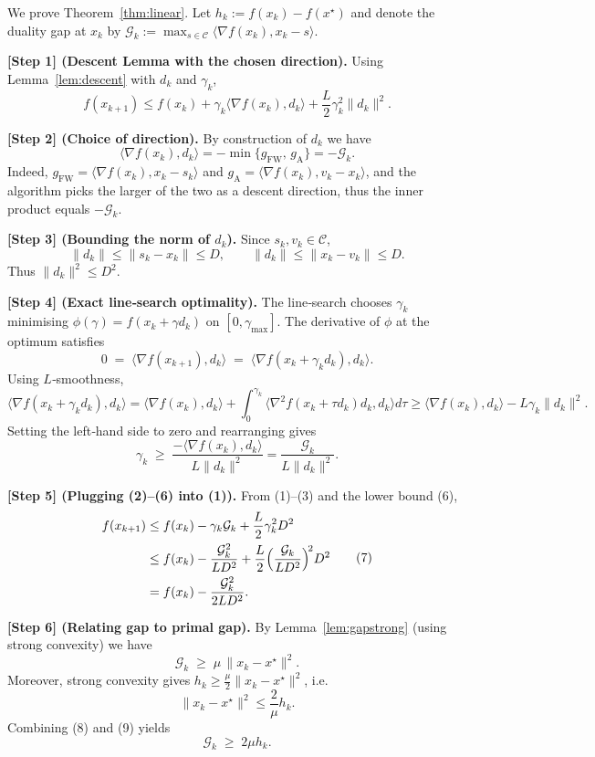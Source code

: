 \documentclass{article}
\newcommand{\gap}{\mathcal{G}}
\begin{document}
We prove Theorem~\ref{thm:linear}. Let $h_k:=f(x_k)-f(x^\star)$ and denote the duality gap at $x_k$ by $\gap_k:=\max_{s\in\mathcal{C}}\langle\nabla f(x_k),x_k-s\rangle$.

\noindent\textbf{[Step 1] (Descent Lemma with the chosen direction).}
Using Lemma~\ref{lem:descent} with $d_k$ and $\gamma_k$,
\[
f(x_{k+1})\le f(x_k)+\gamma_k\langle\nabla f(x_k),d_k\rangle+\frac{L}{2}\gamma_k^2\|d_k\|^2 .
\tag{1}
\]

\noindent\textbf{[Step 2] (Choice of direction).}
By construction of $d_k$ we have
\[
\langle\nabla f(x_k),d_k\rangle = -\min\bigl\{g_{\text{FW}},\,g_{\text{A}}\bigr\}
= -\gap_k .
\tag{2}
\]
Indeed, $g_{\text{FW}}=\langle\nabla f(x_k),x_k-s_k\rangle$ and $g_{\text{A}}=\langle\nabla f(x_k),v_k-x_k\rangle$, and the algorithm picks the larger of the two as a descent direction, thus the inner product equals $-\gap_k$.

\noindent\textbf{[Step 3] (Bounding the norm of $d_k$).}
Since $s_k,v_k\in\mathcal{C}$,
\[
\|d_k\|\le \|s_k-x_k\|\le D,\qquad \|d_k\|\le\|x_k-v_k\|\le D .
\tag{3}
\]
Thus $\|d_k\|^2\le D^2$.

\noindent\textbf{[Step 4] (Exact line‑search optimality).}
The line‑search chooses $\gamma_k$ minimising $\phi(\gamma)=f(x_k+\gamma d_k)$ on $[0,\gamma_{\max}]$. The derivative of $\phi$ at the optimum satisfies
\[
0\;=\;\langle\nabla f(x_{k+1}),d_k\rangle\;=\;\langle\nabla f(x_k+\gamma_k d_k),d_k\rangle .
\tag{4}
\]
Using $L$‑smoothness,
\[
\langle\nabla f(x_k+\gamma_k d_k),d_k\rangle
= \langle\nabla f(x_k),d_k\rangle + \int_{0}^{\gamma_k}\!\!\langle\nabla^2 f(x_k+\tau d_k)d_k,d_k\rangle d\tau
\ge \langle\nabla f(x_k),d_k\rangle - L\gamma_k\|d_k\|^2 .
\tag{5}
\]
Setting the left‑hand side to zero and rearranging gives
\[
\gamma_k\;\ge\;\frac{-\langle\nabla f(x_k),d_k\rangle}{L\|d_k\|^2}
= \frac{\gap_k}{L\|d_k\|^2}.
\tag{6}
\]

\noindent\textbf{[Step 5] (Plugging (2)–(6) into (1)).}
From (1)–(3) and the lower bound (6),
\[
\begin{aligned}
f(x_{k+1}) &\le f(x_k)-\gamma_k\gap_k+\frac{L}{2}\gamma_k^2 D^2\\
&\le f(x_k)-\frac{\gap_k^2}{L D^2}+\frac{L}{2}\Bigl(\frac{\gap_k}{L D^2}\Bigr)^{\!2} D^2 \\
&= f(x_k)-\frac{\gap_k^2}{2L D^2}.
\end{aligned}
\tag{7}
\]

\noindent\textbf{[Step 6] (Relating gap to primal gap).}
By Lemma~\ref{lem:gapstrong} (using strong convexity) we have
\[
\gap_k \;\ge\; \mu\,\|x_k-x^\star\|^2 .
\tag{8}
\]
Moreover, strong convexity gives $h_k\ge \frac{\mu}{2}\|x_k-x^\star\|^2$, i.e.
\[
\|x_k-x^\star\|^2 \le \frac{2}{\mu}h_k .
\tag{9}
\]
Combining (8) and (9) yields
\[
\gap_k \;\ge\; 2\mu h_k .
\tag{10}
\]
\end{document}
